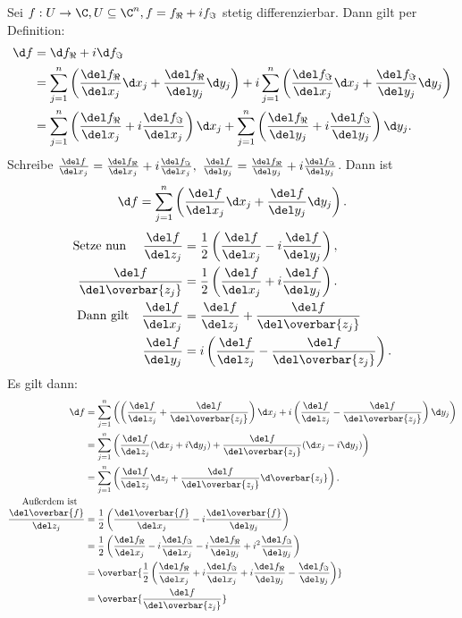 		Sei $ f: U \to \C, U \subseteq \C^n, f= f_\Re + if_\Im $ stetig differenzierbar. Dann gilt per Definition:
		\begin{align*}
			\d f &= \d f_\Re + i\d f_\Im\\
			&= \sum_{j=1}^{n} \left( \frac{\del f_\Re}{\del x_j} \d x_j + \frac{\del f_\Re}{\del y_j}\d y_j \right) + i \sum_{j=1}^n \left( \frac{\del f_\Im}{\del x_j} \d x_j + \frac{\del f_\Im}{\del y_j} \d y_j \right)\\
			&= \sum_{j=1}^{n} \left( \frac{\del f_\Re}{\del x_j} + i \frac{\del f_\Im}{\del x_j} \right) \d x_j + \sum_{j=1}^n \left( \frac{\del f_\Re}{\del y_j} + i \frac{\del f_\Im}{\del y_j} \right) \d y_j.
		\end{align*}
		Schreibe $ \frac{\del f}{\del x_j} = \frac{\del f_\Re}{\del x_j} + i\frac{\del f_\Im}{\del x_j},\ \frac{\del f}{\del y_j} = \frac{\del f_\Re}{\del y_j} + i\frac{\del f_\Im}{\del y_j} $. Dann ist 
		\[ \d f = \sum_{j=1}^n \left( \frac{\del f}{\del x_j} \d x_j + \frac{\del f}{\del y_j} \d y_j \right). \]
		\begin{align*}
			\text{Setze nun }\quad \frac{\del f}{\del z_j} &= \frac{1}{2} \left( \frac{\del f}{\del x_j} - i \frac{\del f}{\del y_j} \right),\\
			\frac{\del f}{\del \overbar{z_j}} &= \frac{1}{2} \left( \frac{\del f}{\del x_j} + i \frac{\del f}{\del y_j} \right).\\
			\text{Dann gilt}\quad \frac{\del f}{\del x_j} &= \frac{\del f}{\del z_j} + \frac{\del f}{\del \overbar{z_j}}\\
			\frac{\del f}{\del y_j} &= i \left(\frac{\del f}{\del z_j} - \frac{\del f}{\del \overbar{z_j}}\right).
		\end{align*}
		Es gilt dann:
		\begin{align*}
			\d f &= \sum_{j=1}^{n} \left( \left( \frac{\del f}{\del z_j} + \frac{\del f}{\del \overbar{z_j}} \right) \d x_j + i \left( \frac{\del f}{\del z_j} - \frac{\del f}{\del \overbar{z_j}} \right) \d y_j \right)\\
			&= \sum_{j=1}^n \left( \frac{\del f}{\del z_j} (\d x_j + i\d y_j) + \frac{\del f}{\del \overbar{z_j}} (\d x_j - i\d y_j) \right)\\
			&= \sum_{j=1}^n \left( \frac{\del f}{\del z_j}\d z_j + \frac{\del f}{\del \overbar{z_j}}\d \overbar{z_j} \right).\\
		\noalign{Außerdem ist}
			\frac{\del \overbar{f}}{\del z_j} &= \frac{1}{2} \left( \frac{\del \overbar{f}}{\del x_j} - i\frac{\del \overbar{f}}{\del y_j} \right)\\
			&= \frac{1}{2} \left( \frac{\del f_\Re}{\del x_j} - i\frac{\del f_\Im}{\del x_j} - i\frac{\del f_\Re}{\del y_j} + i^2\frac{\del f_\Im}{\del y_j} \right)\\
			&= \overbar{\frac{1}{2} \left( \frac{\del f_\Re}{\del x_j} + i\frac{\del f_\Im}{\del x_j} + i\frac{\del f_\Re}{\del y_j} - \frac{\del f_\Im}{\del y_j} \right)}\\
			&= \overbar{\frac{\del f}{\del \overbar{z_j}}}
		\end{align*}
